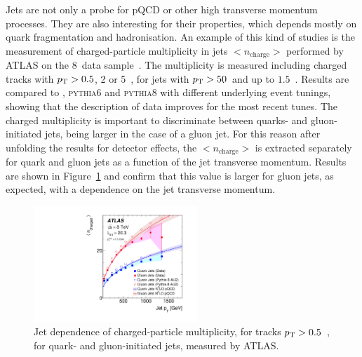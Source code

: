 \documentclass{PoS}
\providecommand{\PYTHIAS} {{\textsc{pythia6}}\xspace}
\providecommand{\PYTHIAE} {{\textsc{pythia8}}\xspace}
\begin{document}
Jets are not only a probe for pQCD or other high transverse momentum processes. They are also interesting for their
properties, which depends mostly on quark fragmentation and hadronisation. An example of this kind of studies is the
measurement of charged-particle multiplicity in jets $<n_\mathrm{charge}>$ performed by ATLAS on the 8~\TeV data sample~\cite{Aad:2016oit}.
The multiplicity is measured including charged tracks with $p_{\mathrm{T}} > 0.5$, 2 or 5~\GeV, for jets with $p_{\mathrm{T}} > 50$~\GeV and up to
$1.5$~\TeV. Results are compared to \HERWIGpp, \PYTHIAS and \PYTHIAE with different underlying event tunings, showing
that the description of data improves for the most recent tunes. 
The charged multiplicity is important to discriminate between quarks- and gluon-initiated jets, being larger in the case
of a gluon jet. For this reason after unfolding the results for detector effects, the  $<n_\mathrm{charge}>$ is
extracted separately for quark and gluon jets as a function of the jet transverse momentum. Results are shown in
Figure~\ref{fig:chargemult} and confirm that this value is larger for gluon jets, as expected, with a dependence on the jet transverse
momentum.
\begin{figure}[hbtp]
  \centering
  \includegraphics[width=0.55\textwidth]{Figure9.pdf}
  \caption{Jet \pt dependence of charged-particle multiplicity, for tracks $p_{\mathrm{T}} > 0.5$~\GeV, for quark- and
    gluon-initiated jets, measured by ATLAS.}
  \label{fig:chargemult}
\end{figure}
\end{document}
